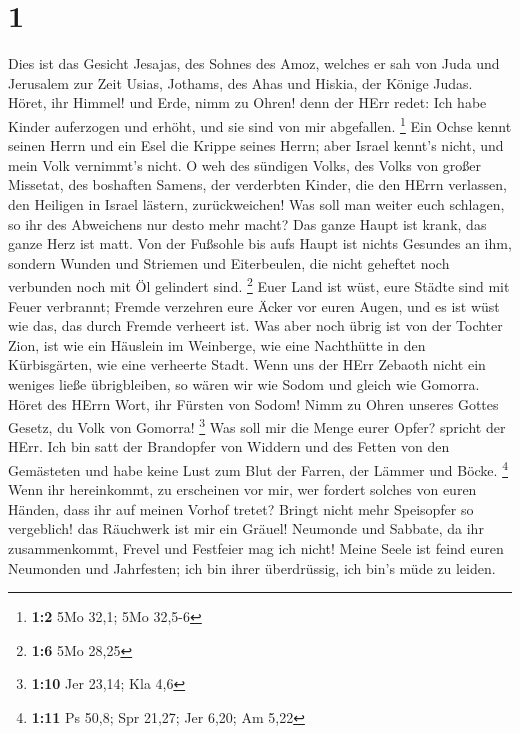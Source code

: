 \hypertarget{section}{%
\section{1}\label{section}}

 Dies ist das Gesicht Jesajas, des Sohnes des Amoz, welches
er sah von Juda und Jerusalem zur Zeit Usias, Jothams, des Ahas und
Hiskia, der Könige Judas.  Höret, ihr Himmel! und Erde, nimm
zu Ohren! denn der HErr redet: Ich habe Kinder auferzogen und erhöht,
und sie sind von mir abgefallen. \footnote{\textbf{1:2} 5Mo 32,1; 5Mo
  32,5-6}  Ein Ochse kennt seinen Herrn und ein Esel die
Krippe seines Herrn; aber Israel kennt's nicht, und mein Volk vernimmt's
nicht.  O weh des sündigen Volks, des Volks von großer
Missetat, des boshaften Samens, der verderbten Kinder, die den HErrn
verlassen, den Heiligen in Israel lästern, zurückweichen! 
Was soll man weiter euch schlagen, so ihr des Abweichens nur desto mehr
macht? Das ganze Haupt ist krank, das ganze Herz ist matt. 
Von der Fußsohle bis aufs Haupt ist nichts Gesundes an ihm, sondern
Wunden und Striemen und Eiterbeulen, die nicht geheftet noch verbunden
noch mit Öl gelindert sind. \footnote{\textbf{1:6} 5Mo 28,25}
 Euer Land ist wüst, eure Städte sind mit Feuer verbrannt;
Fremde verzehren eure Äcker vor euren Augen, und es ist wüst wie das,
das durch Fremde verheert ist.  Was aber noch übrig ist von
der Tochter Zion, ist wie ein Häuslein im Weinberge, wie eine Nachthütte
in den Kürbisgärten, wie eine verheerte Stadt.  Wenn uns der
HErr Zebaoth nicht ein weniges ließe übrigbleiben, so wären wir wie
Sodom und gleich wie Gomorra.  Höret des HErrn Wort, ihr
Fürsten von Sodom! Nimm zu Ohren unseres Gottes Gesetz, du Volk von
Gomorra! \footnote{\textbf{1:10} Jer 23,14; Kla 4,6}  Was
soll mir die Menge eurer Opfer? spricht der HErr. Ich bin satt der
Brandopfer von Widdern und des Fetten von den Gemästeten und habe keine
Lust zum Blut der Farren, der Lämmer und Böcke. \footnote{\textbf{1:11}
  Ps 50,8; Spr 21,27; Jer 6,20; Am 5,22}  Wenn ihr
hereinkommt, zu erscheinen vor mir, wer fordert solches von euren
Händen, dass ihr auf meinen Vorhof tretet?  Bringt nicht
mehr Speisopfer so vergeblich! das Räuchwerk ist mir ein Gräuel!
Neumonde und Sabbate, da ihr zusammenkommt, Frevel und Festfeier mag ich
nicht!  Meine Seele ist feind euren Neumonden und
Jahrfesten; ich bin ihrer überdrüssig, ich bin's müde zu leiden.
